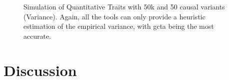 \begin{figure}
{				\label{fig:50k50cQtvarL}
			}
			\caption[Simulation of Quantitative Traits with 50k  and 50 causal variants(Variance)]
			{Simulation of Quantitative Traits with 50k  and 50 causal variants (Variance).
				Again, all the tools can only provide a heuristic estimation of the empirical variance, with \gls{gcta} being the most accurate.
			}
			\label{fig:50k50cQtVar}
		\end{figure}
	\section{Discussion}